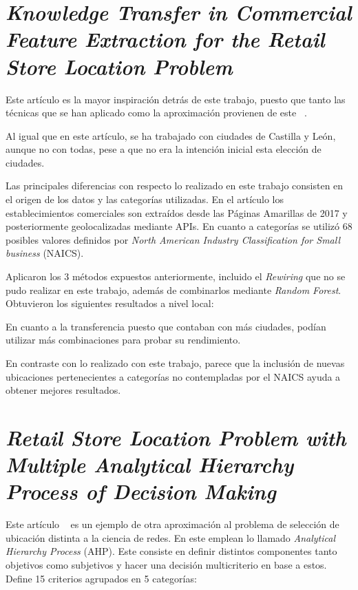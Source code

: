 
\section{\textit{Knowledge Transfer in Commercial Feature Extraction for the Retail Store Location Problem}}


Este artículo es la mayor inspiración detrás de este trabajo, puesto que tanto las técnicas que se han aplicado como la aproximación provienen de este ~\cite{Ahedo2021}. 

Al igual que en este artículo, se ha trabajado con ciudades de Castilla y León, aunque no con todas, pese a que no era la intención inicial esta elección de ciudades. 

Las principales diferencias con respecto lo realizado en este trabajo consisten en el origen de los datos y las categorías utilizadas. En el artículo los establecimientos comerciales son extraídos desde las Páginas Amarillas de 2017 y posteriormente geolocalizadas mediante APIs. En cuanto a categorías se utilizó 68 posibles valores definidos por \textit{North American Industry Classification for Small business} (NAICS).

Aplicaron los 3 métodos expuestos anteriormente, incluido el \textit{Rewiring} que no se pudo realizar en este trabajo, además de combinarlos mediante \textit{Random Forest}. Obtuvieron los siguientes resultados a nivel local:


En cuanto a la transferencia puesto que contaban con más ciudades, podían utilizar más combinaciones para probar su rendimiento.


En contraste con lo realizado con este trabajo, parece que la inclusión de nuevas ubicaciones pertenecientes a categorías no contempladas por el NAICS ayuda a obtener mejores resultados.

\section{\textit{Retail Store Location Problem with Multiple Analytical Hierarchy Process of Decision Making}}

Este artículo ~\cite{RetailTurkey} es un ejemplo de otra aproximación al problema de selección de ubicación distinta a la ciencia de redes. En este emplean lo llamado \textit{Analytical Hierarchy Process} (AHP). Este consiste en definir distintos componentes tanto objetivos como subjetivos y hacer una decisión multicriterio en base a estos. Define 15 criterios agrupados en 5 categorías:


